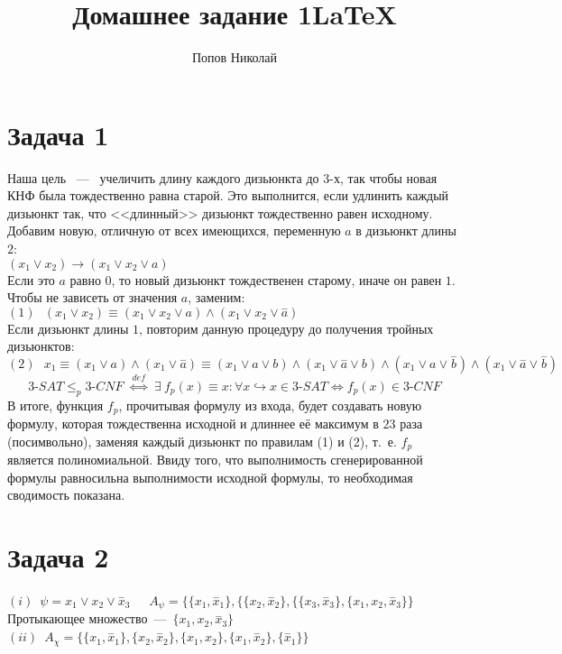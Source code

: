 \documentclass[a4paper,12pt]{article} %
\author{Попов Николай}
\title{Домашнее задание 1\LaTeX{}}
\begin{document}
\section*{Задача 1}
Наша цель ~---~ учеличить длину каждого дизьюнкта до 3-х, так чтобы новая КНФ была тождественно равна старой. Это выполнится, если удлинить каждый дизьюнкт так, что <<длинный>> дизьюнкт тождественно равен исходному. Добавим новую, отличную от всех имеющихся, переменную $ a$ в дизьюнкт длины $2$:\\
$(x_1 \vee x_2) \rightarrow (x_1 \vee x_2 \vee a)$\\
Если это $ a$ равно $0$, то новый дизьюнкт тождественен старому, иначе он равен $1$. Чтобы не зависеть от значения $a $, заменим:\\
$(1)~~~(x_1 \vee x_2) \equiv (x_1 \vee x_2 \vee a)\wedge(x_1 \vee x_2 \vee \overset{-}a)$\\
Если дизьюнкт длины $ 1$, повторим данную процедуру до получения тройных дизьюнктов:\\
$(2)~~~ x_1 \equiv (x_1 \vee a) \wedge (x_1 \vee \overset{-}a) \equiv (x_1 \vee a \vee b) \wedge (x_1 \vee \overset{-}a \vee b) \wedge (x_1 \vee a \vee \overset{-}b) \wedge (x_1 \vee \overset{-}a \vee \overset{-}b)$\\
\[
3\text{-}SAT \leq_p 3\text{-}CNF~~ \overset{def}\Leftrightarrow ~~\exists~ f_p(x)\equiv x: \forall x \hookrightarrow x \in 3\text{-}SAT \Leftrightarrow f_p(x) \in 3\text{-}CNF
\]
В итоге, функция $f_p$, прочитывая формулу из входа, будет создавать новую формулу, которая тождественна исходной и длиннее её максимум в $23$ раза (посимвольно), заменяя каждый дизьюнкт по правилам (1) и (2), т.~е. $f_p$ является полиномиальной. Ввиду того, что выполнимость сгенерированной формулы равносильна выполнимости исходной формулы, то необходимая сводимость показана.\\

\section*{Задача 2}
$(i)$~$\psi = x_1 \vee x_2 \vee \overset{-}x_3$~~~$A_{\psi} = \{\{x_1,\overset{-}x_1\},\{\{x_2,\overset{-}x_2\},\{\{x_3,\overset{-}x_3\},\{x_1,x_2,\overset{-}x_3\}\}$\\
Протыкающее множество~---~$\{x_1,x_2,\overset{-}x_3\}$\\
$(ii)$~$A_{\chi} = \{ \{x_1,\overset{-}x_1\},\{x_2,\overset{-}x_2\},\{x_1,x_2\},\{x_1,\overset{-}x_2\},\{\overset{-}x_1\}\}$ \\
\end{document}
